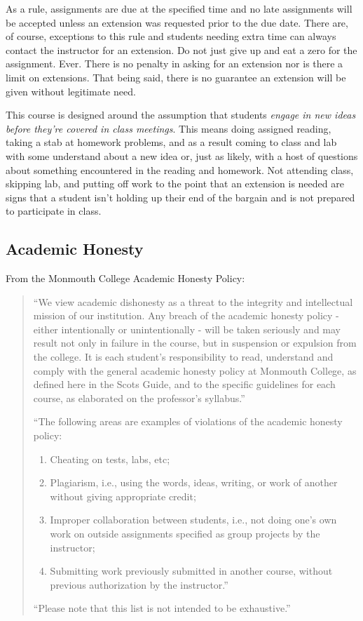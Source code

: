 \documentclass[10pt]{article}
\begin{document}
As a rule, assignments are due at the specified time and no late assignments will be accepted unless an extension was requested prior to the due date. There are, of course, exceptions to this rule and students needing extra time can always contact the instructor for an extension. Do not just give up and eat a zero for the assignment. Ever. There is no penalty in asking for an extension nor is there a limit on extensions.  That being said, there is no guarantee an extension will be given without legitimate need.

This course is designed around the assumption that students \textit{engage in new ideas before they're covered in class meetings}.  This means doing assigned reading, taking a stab at homework problems, and as a result coming to class and lab with some understand about a new idea or, just as likely, with a host of questions about something encountered in the reading and homework. Not attending class, skipping lab, and putting off work to the point that an extension is needed are signs that a student isn't holding up their end of the bargain and is not prepared to participate in class.

\subsection{Academic Honesty}

From the Monmouth College Academic Honesty Policy:
\begin{quote}
  ``We view academic dishonesty as a threat to the integrity and intellectual mission of our institution. Any breach of the academic honesty policy - either intentionally or unintentionally - will be taken seriously and may result not only in failure in the course, but in suspension or expulsion from the college. It is each student’s responsibility to read, understand and comply with the general academic honesty policy at Monmouth College, as defined here in the Scots Guide, and to the specific guidelines for each course, as elaborated on the professor’s syllabus.''

  ``The following areas are examples of violations of the academic honesty policy:
  \begin{enumerate}
  \item Cheating on tests, labs, etc;
  \item Plagiarism, i.e., using the words, ideas, writing, or work of another without giving appropriate credit;
  \item Improper collaboration between students, i.e., not doing one’s own work on outside assignments specified as group projects by the instructor;
  \item Submitting work previously submitted in another course, without previous authorization by the instructor.''
  \end{enumerate}

  ``Please note that this list is not intended to be exhaustive.''
\end{quote}
\end{document}
